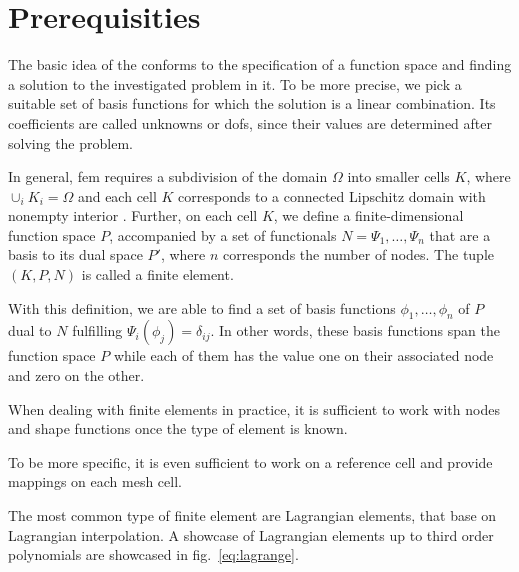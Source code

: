 \section{Prerequisities}
\label{sec:prerequisities}


The basic idea of the  conforms to the specification of a function space and finding a solution to the investigated problem in it. To be more precise, we pick a suitable set of basis functions for which the solution is a linear combination. Its coefficients are called unknowns or \glspl{dof}, since their values are determined after solving the problem.

In general, \gls{fem} requires a subdivision of the domain $\Omega$ into smaller cells $K$, where $\cup_{i} K_i = \Omega$ and each cell $K$ corresponds to a connected Lipschitz domain with nonempty interior .
Further, on each cell $K$, we define a finite-dimensional function space $P$, accompanied by a set of functionals $N = {\Psi_1, \dots, \Psi_n}$ that are a basis to its dual space $P'$, where $n$ corresponds the number of nodes. The tuple $(K,P,N)$ is called a finite element. 

With this definition, we are able to find a set of basis functions ${\phi_1, \dots, \phi_n}$ of $P$ dual to $N$ fulfilling $\Psi_i(\phi_j) = \delta_{ij}$. In other words, these basis functions span the function space $P$ while each of them has the value one on their associated node and zero on the other.

When dealing with finite elements in practice, it is sufficient to work with nodes and shape functions once the type of element is known.

To be more specific, it is even sufficient to work on a reference cell and provide mappings on each mesh cell.

The most common type of finite element are Lagrangian elements, that base on Lagrangian interpolation. A showcase of Lagrangian elements up to third order polynomials are showcased in fig.~\ref{eq:lagrange}.

